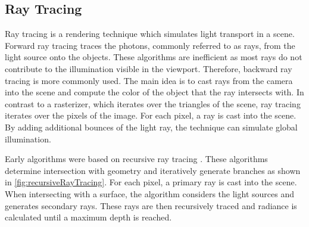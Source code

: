 \subsection{Ray Tracing}
\label{ch:rayTracingTheory}

Ray tracing is a rendering technique which simulates light transport in a scene. Forward ray tracing traces the photons, commonly referred to as rays, from the light source onto the objects. These algorithms are inefficient as most rays do not contribute to the illumination visible in the viewport. Therefore, backward ray tracing is more commonly used. The main idea is to cast rays from the camera into the scene and compute the color of the object that the ray intersects with. In contrast to a rasterizer, which iterates over the triangles of the scene, ray tracing iterates over the pixels of the image. For each pixel, a ray is cast into the scene. By adding additional bounces of the light ray, the technique can simulate global illumination.

Early algorithms were based on recursive ray tracing \cite{whittedGlobalIllumination}. These algorithms determine intersection with geometry and iteratively generate branches as shown in \autoref{fig:recursiveRayTracing}. For each pixel, a primary ray is cast into the scene. When intersecting with a surface, the algorithm considers the light sources and generates secondary rays. These rays are then recursively traced and radiance is calculated until a maximum depth is reached.

